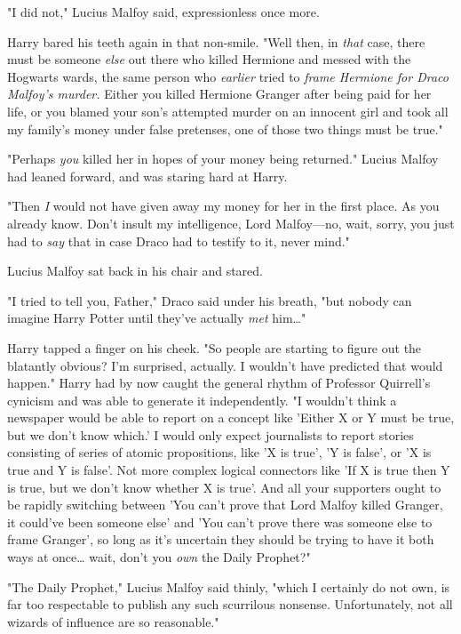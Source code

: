 "I did not," Lucius Malfoy said, expressionless once more.

Harry bared his teeth again in that non-smile. "Well then, in \emph{that} case, 
there must be someone \emph{else} out there who killed Hermione and messed with 
the Hogwarts wards, the same person who\emph{ earlier} tried to\emph{ frame 
Hermione for Draco Malfoy's murder.} Either you killed Hermione Granger after 
being paid for her life, or you blamed your son's attempted murder on an 
innocent girl and took all my family's money under false pretenses, one of 
those two things must be true."

"Perhaps \emph{you} killed her in hopes of your money being returned." Lucius 
Malfoy had leaned forward, and was staring hard at Harry.

"Then \emph{I} would not have given away my money for her in the first place. 
As you already know. Don't insult my intelligence, Lord Malfoy---no, wait, 
sorry, you just had to \emph{say} that in case Draco had to testify to it, 
never mind."

Lucius Malfoy sat back in his chair and stared.

"I tried to tell you, Father," Draco said under his breath, "but nobody can 
imagine Harry Potter until they've actually \emph{met} him{\ldots}"

Harry tapped a finger on his cheek. "So people are starting to figure out the 
blatantly obvious? I'm surprised, actually. I wouldn't have predicted that 
would happen." Harry had by now caught the general rhythm of Professor 
Quirrell's cynicism and was able to generate it independently. "I wouldn't 
think a newspaper would be able to report on a concept like 'Either X or Y must 
be true, but we don't know which.' I would only expect journalists to report 
stories consisting of series of atomic propositions, like 'X is true', 'Y is 
false', or 'X is true and Y is false'. Not more complex logical connectors like 
'If X is true then Y is true, but we don't know whether X is true'. And all 
your supporters ought to be rapidly switching between 'You can't prove that 
Lord Malfoy killed Granger, it could've been someone else' and 'You can't prove 
there was someone else to frame Granger', so long as it's uncertain they should 
be trying to have it both ways at once{\ldots} wait, don't you \emph{own} the 
Daily Prophet?"

"The Daily Prophet," Lucius Malfoy said thinly, "which I certainly do not own, 
is far too respectable to publish any such scurrilous nonsense. Unfortunately, 
not all wizards of influence are so reasonable."

